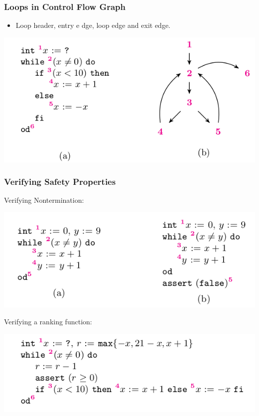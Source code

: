 \documentclass[11pt]{beamer}
\begin{document}
\begin{frame}\frametitle{Loops in Control Flow Graph}
\begin{itemize}
\item Loop header, entry e	dge, loop edge and exit edge.
\end{itemize}

\begin{center}
\includegraphics[scale=0.4]{cfgloops.png}
\end{center}
\end{frame}

\begin{frame}\frametitle{Verifying Safety Properties}
Verifying Nontermination: 
\begin{center}
\includegraphics[scale=0.4]{vnt.png}
\end{center}

Verifying a ranking function: 
\begin{center}
\includegraphics[scale=0.4]{vrf.png}
\end{center}

\end{frame}
\end{document}
